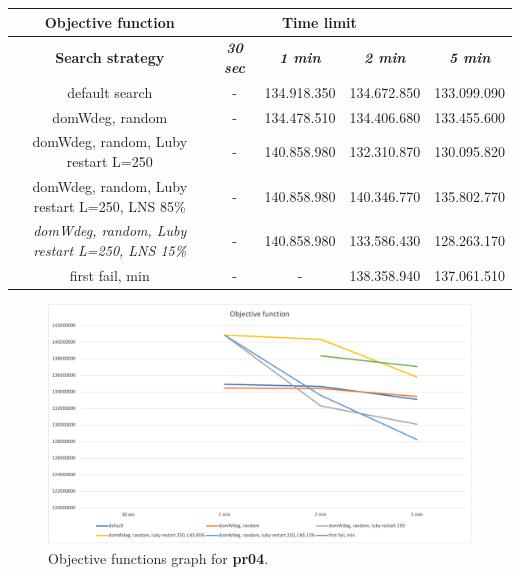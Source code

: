 {
\renewcommand{\arraystretch}{2}
\begin{longtable}[h]{| c | c | c | c | c |}
    \hline
    \textbf{Objective function} & \multicolumn{3}{c}{Time limit} & \\
    \hline
    \textbf{Search strategy} & \textbf{\textit{30 sec}} & \textbf{\textit{1 min}} & \textbf{\textit{2 min}} & \textbf{\textit{5 min}} \\
    \hline
    \endhead
    default search                                         &         - & 134.918.350 & 134.672.850 & 133.099.090 \\
    \hline
    domWdeg, random                                        &         - & 134.478.510 & 134.406.680 & 133.455.600 \\
    \hline
    domWdeg, random, Luby restart L=250                    &         - & 140.858.980 & 132.310.870 & 130.095.820 \\
    \hline
    domWdeg, random, Luby restart L=250, LNS 85\%          &         - & 140.858.980 & 140.346.770 & 135.802.770 \\
    \hline
    \textit{domWdeg, random, Luby restart L=250, LNS 15\%} &         - & 140.858.980 & 133.586.430 & 128.263.170 \\
    \hline
    first fail, min                                        &        - &         - & 138.358.940 & 137.061.510 \\
    \hline
\end{longtable}
}
\begin{figure}[H]
    \centering
    \includegraphics[width=0.8\columnwidth]{../graphs/pr04-objf.png}
    \caption{Objective functions graph for \textbf{pr04}.}
\end{figure}

